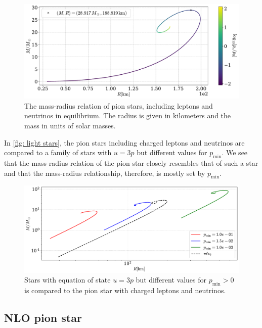 \begin{figure}[!htb]
    \centering
    \includegraphics[width=\textwidth]{../scripts/figurer/pion_star/mass_radius_neutrino.pdf}
    \caption{
        The mass-radius relation of pion stars, including leptons and neutrinos in equilibrium.
        The radius is given in kilometers and the mass in units of solar masses.
        }
        \label{fig: mass radius neutrino}
\end{figure}

In \autoref{fig: light stars}, the pion stars including charged leptons and neutrinos are compared to a family of stars with $u = 3p$ but different values for $p_\text{min}$.
We see that the mass-radius relation of the pion star closely resembles that of such a star and that the mass-radius relationship, therefore, is mostly set by $p_\text{min}$.


\begin{figure}[!htb]
    \centering
    \includegraphics[width=\textwidth]{../scripts/figurer/pion_star/mass_radius_light.pdf}
    \caption{Stars with equation of state $u = 3p$ but different values for $p_\text{min}>0$ is compared to the pion star with charged leptons and neutrinos.}
    \label{fig: light stars}
\end{figure}


\subsection{NLO pion star}

